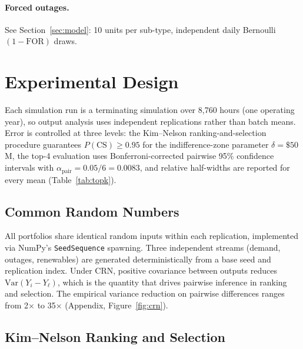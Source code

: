 \documentclass[11pt]{article}
\begin{document}
\paragraph{Forced outages.}
See Section~\ref{sec:model}: 10 units per sub-type, independent daily Bernoulli$(1 - \text{FOR})$ draws.

\section{Experimental Design}\label{sec:design}

Each simulation run is a terminating simulation over 8,760 hours (one operating year), so output analysis uses independent replications rather than batch means. Error is controlled at three levels: the Kim--Nelson ranking-and-selection procedure guarantees $P(\text{CS}) \geq 0.95$ for the indifference-zone parameter $\delta = \$50$M, the top-4 evaluation uses Bonferroni-corrected pairwise 95\% confidence intervals with $\alpha_{\text{pair}} = 0.05/6 = 0.0083$, and relative half-widths are reported for every mean (Table~\ref{tab:topk}).

\subsection{Common Random Numbers}

All portfolios share identical random inputs within each replication, implemented via NumPy's \texttt{SeedSequence} spawning. Three independent streams (demand, outages, renewables) are generated deterministically from a base seed and replication index. Under CRN, positive covariance between outputs reduces $\text{Var}(Y_i - Y_\ell)$, which is the quantity that drives pairwise inference in ranking and selection. The empirical variance reduction on pairwise differences ranges from 2$\times$ to 35$\times$ (Appendix, Figure~\ref{fig:crn}).

\subsection{Kim--Nelson Ranking and Selection}
\end{document}
